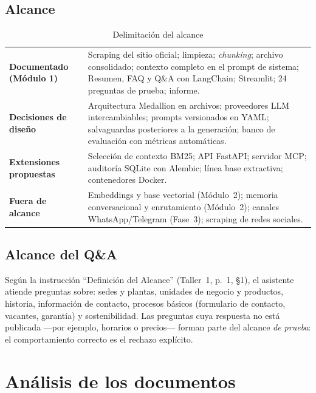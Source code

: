 \section{Alcance}
\begin{table}[H]\centering\small
\caption{Delimitación del alcance}\label{tab:alcance}
\begin{tabularx}{\linewidth}{@{}>{\bfseries}l X@{}}\toprule
Documentado (Módulo 1) & Scraping del sitio oficial; limpieza; \emph{chunking}; archivo consolidado; contexto
completo en el prompt de sistema; Resumen, FAQ y Q\&A con LangChain; Streamlit; 24 preguntas de prueba; informe.\\
Decisiones de diseño & Arquitectura Medallion en archivos; proveedores LLM intercambiables; prompts versionados
en YAML; salvaguardas posteriores a la generación; banco de evaluación con métricas automáticas.\\
Extensiones propuestas & Selección de contexto BM25; API FastAPI; servidor MCP; auditoría SQLite con Alembic;
línea base extractiva; contenedores Docker.\\
Fuera de alcance & Embeddings y base vectorial (Módulo~2); memoria conversacional y enrutamiento (Módulo~2);
canales WhatsApp/Telegram (Fase~3); scraping de redes sociales.\\\bottomrule
\end{tabularx}
\end{table}

\section{Alcance del Q\&A}
Según la instrucción ``Definición del Alcance'' (Taller~1, p.~1, §1), el asistente atiende preguntas sobre:
sedes y plantas, unidades de negocio y productos, historia, información de contacto, procesos básicos
(formulario de contacto, vacantes, garantía) y sostenibilidad. Las preguntas cuya respuesta no está publicada
---por ejemplo, horarios o precios--- forman parte del alcance \emph{de prueba}: el comportamiento correcto es el
rechazo explícito.

\chapter{Análisis de los documentos}\label{cap:documentos}


